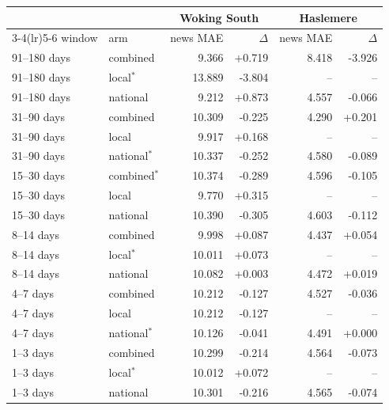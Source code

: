 \begin{tabular}{llrrrr}
\toprule
 &  & \multicolumn{2}{c}{Woking South} & \multicolumn{2}{c}{Haslemere} \\
\cmidrule(lr){3-4}\cmidrule(lr){5-6}
window & arm & news MAE & $\Delta$ & news MAE & $\Delta$ \\
\midrule
91--180 days & combined & 9.366 & +0.719 & 8.418 & -3.926 \\
91--180 days & local$^{*}$ & 13.889 & -3.804 & -- & -- \\
91--180 days & national & 9.212 & +0.873 & 4.557 & -0.066 \\
31--90 days & combined & 10.309 & -0.225 & 4.290 & +0.201 \\
31--90 days & local & 9.917 & +0.168 & -- & -- \\
31--90 days & national$^{*}$ & 10.337 & -0.252 & 4.580 & -0.089 \\
15--30 days & combined$^{*}$ & 10.374 & -0.289 & 4.596 & -0.105 \\
15--30 days & local & 9.770 & +0.315 & -- & -- \\
15--30 days & national & 10.390 & -0.305 & 4.603 & -0.112 \\
8--14 days & combined & 9.998 & +0.087 & 4.437 & +0.054 \\
8--14 days & local$^{*}$ & 10.011 & +0.073 & -- & -- \\
8--14 days & national & 10.082 & +0.003 & 4.472 & +0.019 \\
4--7 days & combined & 10.212 & -0.127 & 4.527 & -0.036 \\
4--7 days & local & 10.212 & -0.127 & -- & -- \\
4--7 days & national$^{*}$ & 10.126 & -0.041 & 4.491 & +0.000 \\
1--3 days & combined & 10.299 & -0.214 & 4.564 & -0.073 \\
1--3 days & local$^{*}$ & 10.012 & +0.072 & -- & -- \\
1--3 days & national & 10.301 & -0.216 & 4.565 & -0.074 \\
\bottomrule
\end{tabular}

